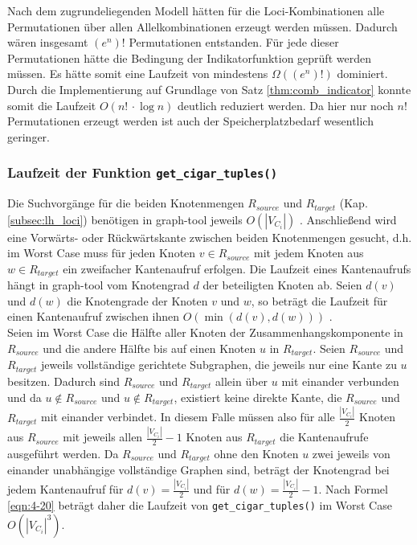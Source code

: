 Nach dem zugrundeliegenden Modell hätten für die Loci-Kombinationen alle Permutationen über allen Allelkombinationen erzeugt werden müssen. Dadurch wären insgesamt $(e^n)!$ Permutationen entstanden. Für jede dieser Permutationen hätte die Bedingung der Indikatorfunktion geprüft werden müssen. Es hätte somit eine Laufzeit von mindestens $\Omega((e^n)!)$ dominiert. Durch die Implementierung auf Grundlage von Satz \ref{thm:comb_indicator} konnte somit die Laufzeit $ O(n!\, \cdotp \log n) $ deutlich reduziert werden. Da hier nur noch $n!$ Permutationen erzeugt werden ist auch der Speicherplatzbedarf wesentlich geringer.

\subsubsection{Laufzeit der Funktion \lstinline|get_cigar_tuples()|}

Die Suchvorgänge für die beiden Knotenmengen $ R_{source} $ und $ R_{target} $ (Kap. \ref{subsec:lh_loci}) benötigen in graph-tool jeweils $O(|V_{C_{i}}|)$ \cite{graph_tool_coplexity_find_vertex}. Anschließend wird eine Vorwärts- oder Rückwärtskante zwischen beiden Knotenmengen gesucht, d.h. im Worst Case muss für jeden Knoten $ v \in R_{source} $ mit jedem Knoten aus $w \in R_{target} $ ein zweifacher Kantenaufruf erfolgen. Die Laufzeit eines Kantenaufrufs hängt in graph-tool vom Knotengrad $d$ der beteiligten Knoten ab. Seien $d(v)$ und $d(w)$ die Knotengrade der Knoten $v$ und $w$, so beträgt die Laufzeit für einen Kantenaufruf zwischen ihnen $ O(\min (d(v), d(w)))$ \cite{docs_graph_tool}. \\

Seien im Worst Case die Hälfte aller Knoten der Zusammenhangskomponente in $ R_{source} $ und die andere Hälfte bis auf einen Knoten $u$ in $ R_{target} $. Seien $ R_{source} $ und $ R_{target} $ jeweils vollständige gerichtete Subgraphen, die jeweils nur eine Kante zu $u$ besitzen. Dadurch sind $ R_{source} $ und $ R_{target} $ allein über $u$ mit einander verbunden und da $u \notin R_{source}$ und $u \notin R_{target}$, existiert keine direkte Kante, die $ R_{source} $ und $ R_{target} $ mit einander verbindet. In diesem Falle müssen also für alle $\frac{|V_{C_{i}}|}{2}$ Knoten aus $ R_{source} $ mit jeweils allen $\frac{|V_{C_{i}}|}{2}-1$ Knoten aus $R_{target}$ die Kantenaufrufe ausgeführt werden. Da $ R_{source} $ und $ R_{target} $ ohne den Knoten $u$ zwei jeweils von einander unabhängige vollständige Graphen sind, beträgt der Knotengrad bei jedem Kantenaufruf für $d(v) = \frac{|V_{C_{i}}|}{2}$ und für $d(w) = \frac{|V_{C_{i}}|}{2} -1$. Nach Formel \eqref{eqn:4-20} beträgt daher die Laufzeit von \lstinline|get_cigar_tuples()| im Worst Case $O(|V_{C_{i}}|^3)$. \\

